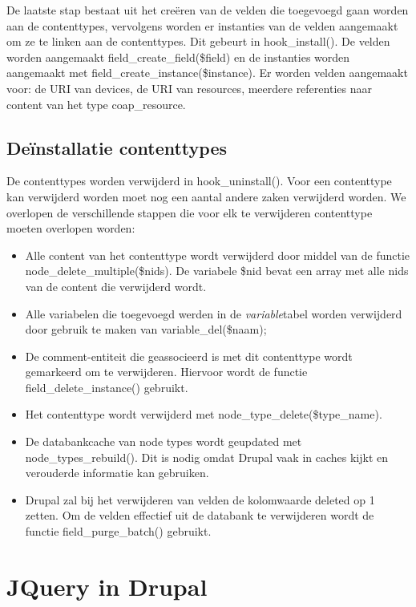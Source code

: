\noindent
De laatste stap bestaat uit het cre\"{e}ren van de velden die toegevoegd gaan worden aan de contenttypes, vervolgens worden er instanties van de velden aangemaakt om ze te linken aan de contenttypes. Dit gebeurt in hook\_install(). De velden worden aangemaakt field\_create\_field(\$field) en de instanties worden aangemaakt met field\_create\_instance(\$instance). Er worden velden aangemaakt voor: de URI van devices, de URI van resources, meerdere referenties naar content van het type coap\_resource. %

\subsection{De\"{i}nstallatie contenttypes}
De contenttypes worden verwijderd in hook\_uninstall(). Voor een contenttype kan verwijderd worden moet nog een aantal andere zaken verwijderd worden. We overlopen de verschillende stappen die voor elk te verwijderen contenttype moeten overlopen worden:
\begin{itemize}
\item Alle content van het contenttype wordt verwijderd door middel van de functie\\ node\_delete\_multiple(\$nids). De variabele \$nid bevat een array met alle nids van de content die verwijderd wordt.
\item Alle variabelen die toegevoegd werden in de \textit{variable}tabel worden verwijderd door gebruik te maken van variable\_del(\$naam);
\item De comment-entiteit die geassocieerd is met dit contenttype wordt gemarkeerd om te verwijderen. Hiervoor wordt de functie field\_delete\_instance() gebruikt.
\item Het contenttype wordt verwijderd met node\_type\_delete(\$type\_name).
\item De databankcache van node types wordt geupdated met node\_types\_rebuild(). Dit is nodig omdat Drupal vaak in caches kijkt en verouderde informatie kan gebruiken.
\item Drupal zal bij het verwijderen van velden de kolomwaarde deleted op 1 zetten. Om de velden effectief uit de databank te verwijderen wordt de functie field\_purge\_batch() gebruikt.
\end{itemize}

\section{JQuery in Drupal} \label{jQuery}

